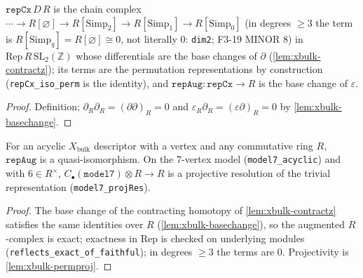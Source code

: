 \begin{definition}\label{def:xbulk-repcx}
  \leanok
  $\mathtt{repCx}\,D\,R$ is the chain complex $\cdots\to R[\varnothing]\to R[\mathrm{Simp}_2]\to R[\mathrm{Simp}_1]\to R[\mathrm{Simp}_0]$
  (in degrees $\ge3$ the term is $R[\mathrm{Simp}_q]=R[\varnothing]\cong0$, not literally $0$: \texttt{dim2}; F3-19 MINOR 8) in
  $\mathrm{Rep}\,R\,\mathrm{SL}_2(\mathbb Z)$ whose differentials are the base changes of $\partial$ (\ref{lem:xbulk-contractz});
  its terms are the permutation representations by construction (\texttt{repCx\_iso\_perm} is the identity), and
  $\mathtt{repAug}:\mathtt{repCx}\to R$ is the base change of $\varepsilon$.
\end{definition}
\begin{proof}
  \leanok
  Definition; $\partial_R\partial_R=(\partial\partial)_R=0$ and $\varepsilon_R\partial_R=(\varepsilon\partial)_R=0$ by
  \ref{lem:xbulk-basechange}.
\end{proof}

\begin{theorem}\label{thm:xbulk-repaug}
  \leanok
  For an acyclic $X_{\mathrm{bulk}}$ descriptor with a vertex and any commutative ring $R$, $\mathtt{repAug}$ is a
  quasi-isomorphism. On the 7-vertex model (\texttt{model7\_acyclic}) and with $6\in R^\times$,
  $C_\bullet(\mathtt{model7})\otimes R\to R$ is a projective resolution of the trivial representation
  (\texttt{model7\_projRes}).
\end{theorem}
\begin{proof}
  \leanok
  The base change of the contracting homotopy of \ref{lem:xbulk-contractz} satisfies the same identities over $R$
  (\ref{lem:xbulk-basechange}), so the augmented $R$-complex is exact; exactness in $\mathrm{Rep}$ is checked on underlying
  modules (\texttt{reflects\_exact\_of\_faithful}); in degrees $\ge3$ the terms are $0$. Projectivity is
  \ref{lem:xbulk-permproj}.
\end{proof}

